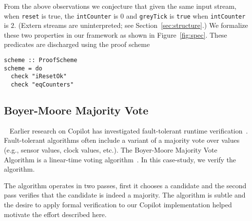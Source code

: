 From the above observations we 
conjecture that given the same input stream, when \texttt{reset} is
true,  the \texttt{intCounter} is $0$ and \texttt{greyTick} is
\texttt{true} when \texttt{intCounter} is $2.$ (Extern streams are
uninterpreted; see Section~\ref{sec:structure}.) We formalize these two
properties in our framework as shown in Figure~\ref{fig:spec}.
These predicates are discharged using the proof scheme
\begin{lstlisting}[frame=single]
scheme :: ProofScheme
scheme = do
  check "iResetOk"
  check "eqCounters"
\end{lstlisting}  

\subsection{Boyer-Moore Majority Vote}~\label{sec:mvote}
Earlier research on Copilot  has investigated fault-tolerant
runtime verification~\cite{pike-isse-13}. Fault-tolerant algorithms often
include a variant of a majority vote over values (e.g., sensor values, clock
values, etc.). The Boyer-Moore
Majority Vote Algorithm is a linear-time voting
algorithm~\cite{MooreBoyer82,Hesselink2005}. In this case-study, we verify the
algorithm.

The algorithm operates in two passes, first it chooses a candidate and the
second pass verifies that the candidate is indeed a majority.  The algorithm is
subtle and the desire to apply formal verification to our Copilot implementation
helped motivate the effort described here.




%

